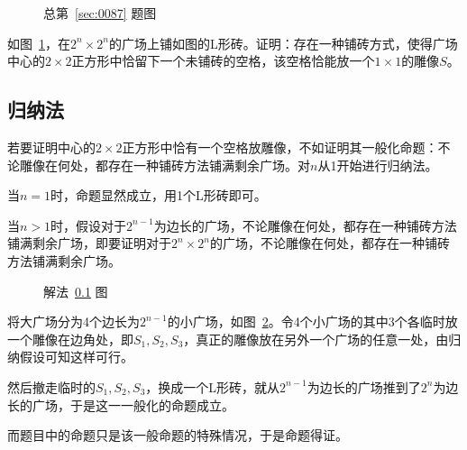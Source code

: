 

\begin{figure}[htbp]
  \centering
  \caption{总第~\ref{sec:0087} 题图} \label{fig:0087}
\end{figure}

如图~\ref{fig:0087}，在$2^n\times2^n$的广场上铺如图的L形砖。证明：存在一种铺砖方式，使得广场中心的$2\times2$正方形中恰留下一个未铺砖的空格，该空格恰能放一个$1\times1$的雕像$S$。

\subsection{归纳法} \label{subsec:0087-sep}

若要证明中心的$2\times2$正方形中恰有一个空格放雕像，不如证明其一般化命题：不论雕像在何处，都存在一种铺砖方法铺满剩余广场。对$n$从1开始进行归纳法。

当$n = 1$时，命题显然成立，用1个L形砖即可。

当$n > 1$时，假设对于$2^{n - 1}$为边长的广场，不论雕像在何处，都存在一种铺砖方法铺满剩余广场，即要证明对于$2^n\times2^n$的广场，不论雕像在何处，都存在一种铺砖方法铺满剩余广场。

\begin{figure}[htbp]
  \centering
  \caption{解法~\ref{subsec:0087-sep} 图} \label{fig:0087-sep}
\end{figure}

将大广场分为4个边长为$2^{n - 1}$的小广场，如图~\ref{fig:0087-sep}。令4个小广场的其中3个各临时放一个雕像在边角处，即$S_1, S_2, S_3$，真正的雕像放在另外一个广场的任意一处，由归纳假设可知这样可行。

然后撤走临时的$S_1, S_2, S_3$，换成一个L形砖，就从$2^{n - 1}$为边长的广场推到了$2^n$为边长的广场，于是这一一般化的命题成立。

而题目中的命题只是该一般命题的特殊情况，于是命题得证。
